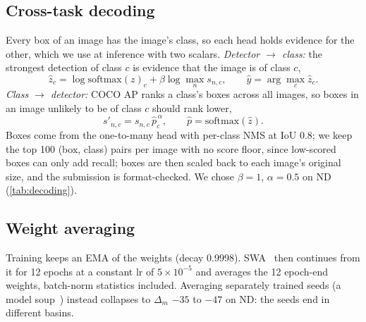 \subsection{Cross-task decoding}
\label{sec:decoding}
Every box of an image has the image's class, so each head holds evidence for the other, which we use at inference
with two scalars.
\emph{Detector $\to$ class:} the strongest detection of class $c$ is evidence that the image is of class $c$,
\begin{equation}
  \hat z_c=\log\mathrm{softmax}(z)_c+\beta\log\max_n s_{n,c},\qquad \hat y=\arg\max_c \hat z_c.
  \label{eq:fuse}
\end{equation}
\emph{Class $\to$ detector:} COCO AP ranks a class's boxes across all images, so boxes in an image unlikely to be of
class $c$ should rank lower,
\begin{equation}
  s'_{n,c}=s_{n,c}\,\hat p_c^{\,\alpha},\qquad \hat p=\mathrm{softmax}(\hat z).
  \label{eq:jd}
\end{equation}
Boxes come from the one-to-many head with per-class NMS at IoU 0.8; we keep the top 100 (box, class) pairs per image
with no score floor, since low-scored boxes can only add recall; boxes are then scaled back to each image's original
size, and the submission is format-checked.
We chose $\beta{=}1$, $\alpha{=}0.5$ on ND (\cref{tab:decoding}).

\subsection{Weight averaging}
\label{sec:swa}
Training keeps an EMA of the weights (decay 0.9998).
SWA~\cite{izmailov2018swa} then continues from it for 12 epochs at a constant lr of $5{\times}10^{-5}$ and averages
the 12 epoch-end weights, batch-norm statistics included.
Averaging separately trained seeds (a model soup~\cite{wortsman2022soups}) instead collapses to $\Delta_m$ ${-}35$ to
${-}47$ on ND: the seeds end in different basins.
